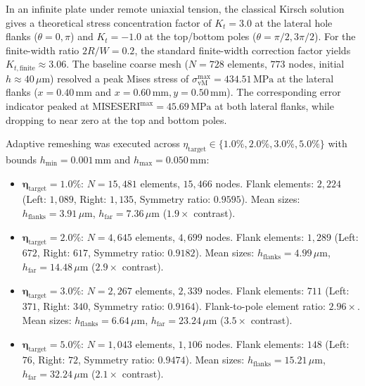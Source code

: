 In an infinite plate under remote uniaxial tension, the classical Kirsch solution gives a theoretical stress concentration factor of $K_t = 3.0$ at the lateral hole flanks ($\theta = 0, \pi$) and $K_t = -1.0$ at the top/bottom poles ($\theta = \pi/2, 3\pi/2$). For the finite-width ratio $2R/W = 0.2$, the standard finite-width correction factor yields $K_{t,\mathrm{finite}} \approx 3.06$. The baseline coarse mesh ($N = 728$ elements, $773$ nodes, initial $h \approx 40\,\mu\mathrm{m}$) resolved a peak Mises stress of $\sigma_{\mathrm{vM}}^{\max} = 434.51\,\mathrm{MPa}$ at the lateral flanks ($x = 0.40\,\mathrm{mm}$ and $x = 0.60\,\mathrm{mm}, y = 0.50\,\mathrm{mm}$). The corresponding error indicator peaked at $\mathrm{MISESERI}^{\max} = 45.69\,\mathrm{MPa}$ at both lateral flanks, while dropping to near zero at the top and bottom poles.

Adaptive remeshing was executed across $\eta_{\mathrm{target}} \in \{1.0\%, 2.0\%, 3.0\%, 5.0\%\}$ with bounds $h_{\min} = 0.001\,\mathrm{mm}$ and $h_{\max} = 0.050\,\mathrm{mm}$:
\begin{itemize}
  \item $\mathbf{\eta_{\mathrm{target}} = 1.0\%}$: $N = 15{,}481$ elements, $15{,}466$ nodes. Flank elements: $2{,}224$ (Left: $1{,}089$, Right: $1{,}135$, Symmetry ratio: $\mathbf{0.9595}$). Mean sizes: $h_{\text{flanks}} = 3.91\,\mu\mathrm{m}$, $h_{\text{far}} = 7.36\,\mu\mathrm{m}$ ($1.9\times$ contrast).
  \item $\mathbf{\eta_{\mathrm{target}} = 2.0\%}$: $N = 4{,}645$ elements, $4{,}699$ nodes. Flank elements: $1{,}289$ (Left: $672$, Right: $617$, Symmetry ratio: $\mathbf{0.9182}$). Mean sizes: $h_{\text{flanks}} = 4.99\,\mu\mathrm{m}$, $h_{\text{far}} = 14.48\,\mu\mathrm{m}$ ($2.9\times$ contrast).
  \item $\mathbf{\eta_{\mathrm{target}} = 3.0\%}$: $N = 2{,}267$ elements, $2{,}339$ nodes. Flank elements: $711$ (Left: $371$, Right: $340$, Symmetry ratio: $\mathbf{0.9164}$). Flank-to-pole element ratio: $2.96\times$. Mean sizes: $h_{\text{flanks}} = 6.64\,\mu\mathrm{m}$, $h_{\text{far}} = 23.24\,\mu\mathrm{m}$ ($3.5\times$ contrast).
  \item $\mathbf{\eta_{\mathrm{target}} = 5.0\%}$: $N = 1{,}043$ elements, $1{,}106$ nodes. Flank elements: $148$ (Left: $76$, Right: $72$, Symmetry ratio: $\mathbf{0.9474}$). Mean sizes: $h_{\text{flanks}} = 15.21\,\mu\mathrm{m}$, $h_{\text{far}} = 32.24\,\mu\mathrm{m}$ ($2.1\times$ contrast).
\end{itemize}

